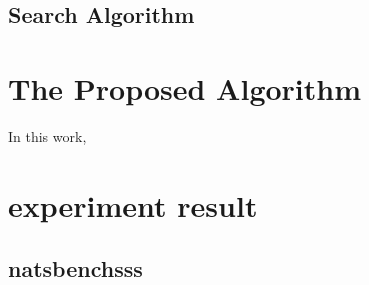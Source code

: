 \documentclass[sigconf]{acmart}
\begin{document}
    \subsection{Search Algorithm}


    \section{The Proposed Algorithm}
    \label{sec:proposed}
    In this work, 


    \section{experiment result}
    \label{sec:results} 

    \subsection*{natsbenchsss}
\end{document}
